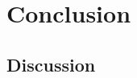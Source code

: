 \documentclass[11pt]{article}
\begin{document}








\section{Conclusion}

\subsection{Discussion}
\end{document}
